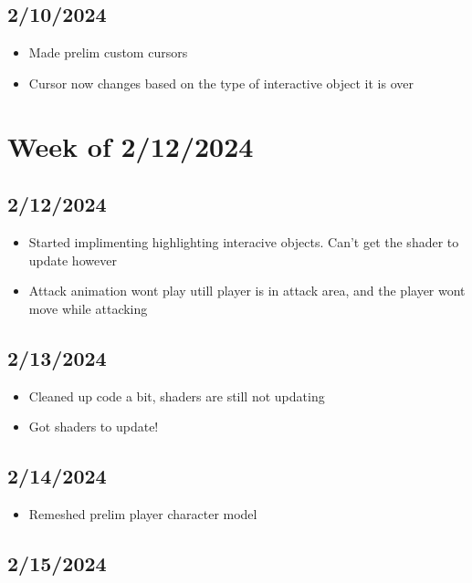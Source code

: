 \documentclass{article}
\begin{document}
\subsection*{2/10/2024}


\begin{itemize}
   \item Made prelim custom cursors
   \item Cursor now changes based on the type of interactive object it is over
\end{itemize}

\section*{Week of 2/12/2024}
\subsection*{2/12/2024}

\begin{itemize}
   \item Started implimenting highlighting interacive objects. Can't get the shader to update however
   \item Attack animation wont play utill player is in attack area, and the player wont move while attacking
\end{itemize}

\subsection*{2/13/2024}

\begin{itemize}
   \item Cleaned up code a bit, shaders are still not updating
   \item Got shaders to update!
\end{itemize}

\subsection*{2/14/2024}

\begin{itemize}
   \item Remeshed prelim player character model
\end{itemize}

\subsection*{2/15/2024}
\end{document}
